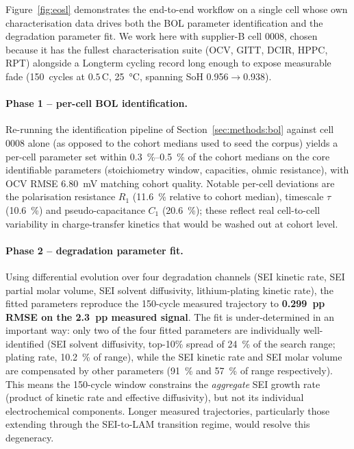 \documentclass[preprint,12pt,3p,authoryear]{elsarticle}
\begin{document}
Figure~\ref{fig:eosl} demonstrates the end-to-end workflow on a single
cell whose own characterisation data drives both the BOL parameter
identification and the degradation parameter fit. We work here with
supplier-B cell 0008, chosen because it has the fullest characterisation
suite (OCV, GITT, DCIR, HPPC, RPT) alongside a Longterm cycling record
long enough to expose measurable fade
(150~cycles at \(0.5\)\,C, \SI{25}{\celsius}, spanning SoH
\num{0.956}$\to$\num{0.938}).

\paragraph{Phase 1 -- per-cell BOL identification.}
Re-running the identification pipeline of Section~\ref{sec:methods:bol}
against cell 0008 alone (as opposed to the cohort medians used to seed
the corpus) yields a per-cell parameter set within
\SIrange{0.3}{0.5}{\percent} of the cohort medians on the core
identifiable parameters (stoichiometry window, capacities, ohmic
resistance), with OCV RMSE \SI{6.80}{\milli\volt} matching cohort
quality. Notable per-cell deviations are the polarisation resistance
\(R_1\) (\qty{+11.6}{\percent} relative to cohort median), timescale
\(\tau\) (\qty{+10.6}{\percent}) and pseudo-capacitance \(C_1\)
(\qty{+20.6}{\percent}); these reflect real cell-to-cell variability
in charge-transfer kinetics that would be washed out at cohort level.

\paragraph{Phase 2 -- degradation parameter fit.}
Using differential evolution over four degradation channels
(SEI kinetic rate, SEI partial molar volume, SEI solvent diffusivity,
lithium-plating kinetic rate), the fitted parameters reproduce the
150-cycle measured trajectory to \textbf{\SI{0.299}{pp} RMSE on the
\SI{2.3}{pp} measured signal}. The fit is under-determined in an
important way: only two of the four fitted parameters are individually
well-identified (SEI solvent diffusivity, top-10\% spread of
\SI{24}{\percent} of the search range; plating rate, \SI{10.2}{\percent}
of range), while the SEI kinetic rate and SEI molar volume are
compensated by other parameters (\SI{91}{\percent} and \SI{57}{\percent}
of range respectively). This means the 150-cycle window constrains the
\emph{aggregate} SEI growth rate (product of kinetic rate and effective
diffusivity), but not its individual electrochemical components.
Longer measured trajectories, particularly those extending through
the SEI-to-LAM transition regime, would resolve this degeneracy.
\end{document}
